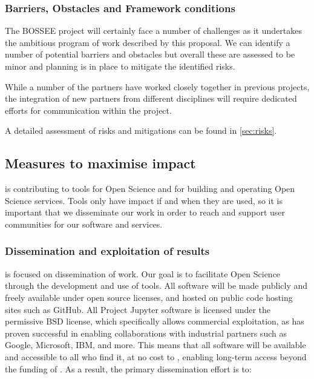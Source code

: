 \subsubsection{Barriers, Obstacles and Framework conditions}

The BOSSEE project will certainly face a number of challenges as it undertakes
the ambitious program of work described by this proposal.
We can identify a number of potential barriers and obstacles but overall
these are assessed to be minor and planning is in place to mitigate the
identified risks.

While a number of the partners have worked closely together in previous projects,
the integration of new partners from different disciplines will require
dedicated efforts for communication within the project.

A detailed assessment of risks and mitigations can be found in \ref{sec:risks}.

\subsection{Measures to maximise impact}

\TheProject is contributing to tools for Open Science and for building and operating Open Science services.
Tools only have impact if and when they are used,
so it is important that we disseminate our work
in order to reach and support user communities for our software and services.

\subsubsection{Dissemination and exploitation of results}

 is focused on dissemination of \TheProject work.
Our goal is to facilitate Open Science through the development and use of tools.
All \TheProject software will be made publicly and freely available under open source licenses, and hosted on public code hosting sites such as GitHub.
All Project Jupyter software is licensed under the permissive BSD license,
which specifically allows commercial exploitation,
as has proven successful in enabling collaborations with industrial partners
such as Google, Microsoft, IBM, and more.
This means that all \TheProject software will be available and accessible to all who find it,
at no cost to \TheProject,
enabling long-term access beyond the funding of \TheProject.
As a result, the primary dissemination effort is to:

